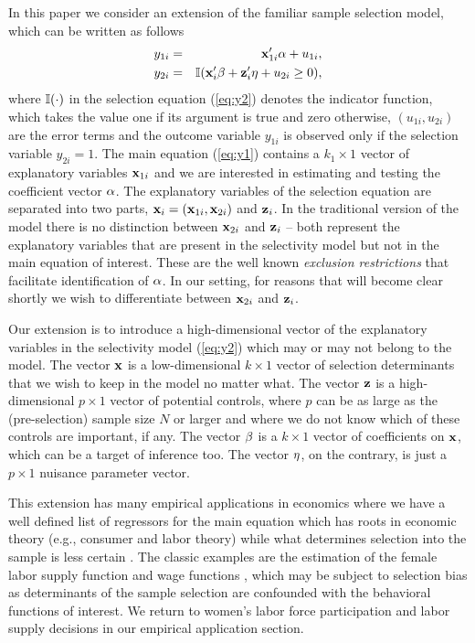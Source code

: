 \documentclass[11pt]{article}
\begin{document}
In this paper we consider an extension of the familiar \cite{Heckman1979} sample selection model, %
which can be written as follows
\begin{eqnarray}
	y_{1i} &=& \mathbf{x}_{1i}'\mathbf{\alpha} + u_{1i},  
	\label{eq:y1}\\
y_{2i} &= &\mathbb{I}(\mathbf{x}_i'\mathbf{\beta}+  \mathbf{z}_i' \mathbf{\eta} + u_{2i} \geq 0),
	\label{eq:y2}
\end{eqnarray}
where  $\mathbb{I}(\cdot)$ in the selection equation (\ref{eq:y2}) denotes the indicator function, which takes the value one if its argument is true and zero otherwise, $(u_{1i}, u_{2i})$ are the error terms and the outcome variable $y_{1i}$ is observed only if the selection variable $y_{2i} = 1$. The main equation (\ref{eq:y1}) contains a %
$k_1 \times 1$ vector of explanatory variables $\mathbf{x}_{1i}$ and we are interested in estimating and testing the coefficient vector $\mathbf{\alpha}$. The explanatory variables of the selection equation are separated into two parts, $\mathbf{x}_i=(\mathbf{x}_{1i},\mathbf{x}_{2i})$ and $\mathbf{z}_i$. In the traditional version of the model there is no distinction between $\mathbf{x}_{2i}$ and $\mathbf{z}_i$ -- both represent the explanatory variables that are present in the selectivity model but not in the main equation of interest. These are the well known \emph{exclusion restrictions} that facilitate identification of $\mathbf{\alpha}$. In our setting, for reasons that will become clear shortly we wish to differentiate between $\mathbf{x}_{2i}$ and $\mathbf{z}_i$. 

Our extension is to introduce a high-dimensional vector of the explanatory variables in the selectivity model (\ref{eq:y2}) which may or may not belong to the model. The vector $\mathbf{x}$ is a
low-dimensional $k \times 1$ vector of selection determinants that we wish to keep in the model no matter what. %
The vector $\mathbf{z}$ is a high-dimensional $p \times 1$ vector of potential
controls, where $p$ can be as large as the (pre-selection) sample size $N$ or larger and where we do not know which of these controls are important, if any.  The vector
$\mathbf{\beta}$ is a $k \times 1$ vector of coefficients on $\mathbf{x}$, which can be a target of inference too. The vector $\mathbf{\eta}$, on the contrary, is just a $p \times 1$ nuisance parameter vector. 

This extension has many empirical applications in economics where we have a well defined list of regressors for the main equation which has roots in economic theory (e.g., consumer and labor theory) while what determines selection into the sample is less certain \cite[see, e.g.,][]{roy:51, heckman/honore:90}. The classic examples are the estimation of the female labor supply function and  wage functions \citep[see, e.g.,][]{Heckman1979, arellano/bonhomme:17}, which may be subject to selection bias as determinants of the sample selection are confounded with the behavioral functions of interest.
We return to women's labor force participation and labor supply decisions in our empirical application section.
\end{document}
